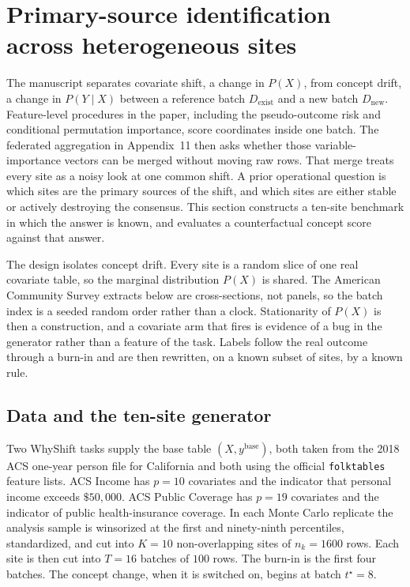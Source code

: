 
\section{Primary-source identification across heterogeneous sites}
\label{sec:primary-source}

The manuscript separates covariate shift, a change in $P(X)$, from concept
drift, a change in $P(Y\mid X)$ between a reference batch
$D_{\mathrm{exist}}$ and a new batch $D_{\mathrm{new}}$.
Feature-level procedures in the paper, including the pseudo-outcome
risk and conditional permutation importance, score coordinates inside one
batch.
The federated aggregation in Appendix~11 then asks whether those
variable-importance vectors can be merged without moving raw rows.
That merge treats every site as a noisy look at one common shift.
A prior operational question is which sites are the primary sources of the
shift, and which sites are either stable or actively destroying the
consensus.
This section constructs a ten-site benchmark in which the answer is known,
and evaluates a counterfactual concept score against that answer.

The design isolates concept drift.
Every site is a random slice of one real covariate table, so the marginal
distribution $P(X)$ is shared.
The American Community Survey extracts below are cross-sections, not
panels, so the batch index is a seeded random order rather than a clock.
Stationarity of $P(X)$ is then a construction, and a covariate arm that
fires is evidence of a bug in the generator rather than a feature of the
task.
Labels follow the real outcome through a burn-in and are then rewritten,
on a known subset of sites, by a known rule.

\subsection{Data and the ten-site generator}
\label{sec:dgp}

Two WhyShift tasks supply the base table $(X,y^{\mathrm{base}})$, both
taken from the 2018 ACS one-year person file for California and both using
the official \texttt{folktables} feature lists.
ACS Income has $p=10$ covariates and the indicator that personal income
exceeds $\$50{,}000$.
ACS Public Coverage has $p=19$ covariates and the indicator of public
health-insurance coverage.
In each Monte Carlo replicate the analysis sample is winsorized at the
first and ninety-ninth percentiles, standardized, and cut into $K=10$
non-overlapping sites of $n_k=1600$ rows.
Each site is then cut into $T=16$ batches of $100$ rows.
The burn-in is the first four batches.
The concept change, when it is switched on, begins at batch
$t^\star=8$.

